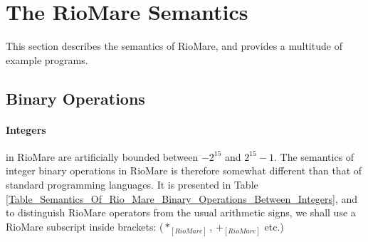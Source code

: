 \documentclass{article}
\begin{document}
\section{The RioMare Semantics}
This section describes the semantics of RioMare,
and provides a multitude of example programs.
\newpage
\subsection{Binary Operations}
\paragraph{Integers} in RioMare are artificially bounded between $-2^{15}$ and $2^{15}-1$.
The semantics of integer binary operations in RioMare is therefore somewhat different
than that of standard programming languages.
It is presented in Table \ref{Table_Semantics_Of_Rio_Mare_Binary_Operations_Between_Integers},
and to distinguish RioMare operators from the usual arithmetic signs,
we shall use a RioMare subscript inside brackets:
($*_{[RioMare]}$, $+_{[RioMare]}$ etc.)
\end{document}
